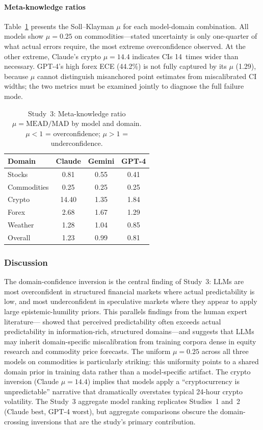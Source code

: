 \paragraph{Meta-knowledge ratios} Table~\ref{tab:mead} presents the
Soll--Klayman $\mu$ for each model-domain combination. All models show
$\mu = 0.25$ on commodities---stated uncertainty is only one-quarter of
what actual errors require, the most extreme overconfidence observed.
At the other extreme, Claude's crypto $\mu = 14.4$ indicates CIs 14~times
wider than necessary. GPT-4's high forex ECE (44.2\%) is not fully captured
by its $\mu$ (1.29), because $\mu$ cannot distinguish misanchored point
estimates from miscalibrated CI widths; the two metrics must be examined
jointly to diagnose the full failure mode.

\begin{table}[ht]
  \centering
  \caption{Study~3: Meta-knowledge ratio $\mu = \text{MEAD}/\text{MAD}$
    by model and domain. $\mu < 1$ = overconfidence;
    $\mu > 1$ = underconfidence.}
  \label{tab:mead}
  \begin{tabular}{lccc}
    \toprule
    Domain       & Claude & Gemini & GPT-4 \\
    \midrule
    Stocks       & 0.81   & 0.55   & 0.41  \\
    Commodities  & 0.25   & 0.25   & 0.25  \\
    Crypto       & 14.40  & 1.35   & 1.84  \\
    Forex        & 2.68   & 1.67   & 1.29  \\
    Weather      & 1.28   & 1.04   & 0.85  \\
    \midrule
    Overall      & 1.23   & 0.99   & 0.81  \\
    \bottomrule
  \end{tabular}
\end{table}

\subsubsection*{Discussion}

The domain-confidence inversion is the central finding of Study~3: LLMs are
most overconfident in structured financial markets where actual predictability
is low, and most underconfident in speculative markets where they appear to
apply large epistemic-humility priors. This parallels findings from the human
expert literature---\citet{Griffin1992} showed that perceived predictability
often exceeds actual predictability in information-rich, structured
domains---and suggests that LLMs may inherit domain-specific miscalibration
from training corpora dense in equity research and commodity price forecasts.
The uniform $\mu = 0.25$ across all three models on commodities is
particularly striking: this uniformity points to a shared domain prior in
training data rather than a model-specific artifact. The crypto inversion
(Claude $\mu = 14.4$) implies that models apply a ``cryptocurrency is
unpredictable'' narrative that dramatically overstates typical 24-hour
crypto volatility. The Study~3 aggregate model ranking replicates Studies~1
and~2 (Claude best, GPT-4 worst), but aggregate comparisons obscure the
domain-crossing inversions that are the study's primary contribution.
